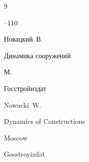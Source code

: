 \begin{thebibliography}{9}


--110






\by Новацкий~В.

\book Динамика сооружений

\publaddr М.

\publ Госстройиздат



\misctransl

\by Nowacki~W. 

\book Dynamics of Constructions

\publaddr Moscow

\publ Gosstroyizdat





\end{thebibliography}







\noindent

\hskip6.5cm \thedate \par\noindent

\hskip6.5cm\therevdate













\makeengtitle



\newpage



%

%

